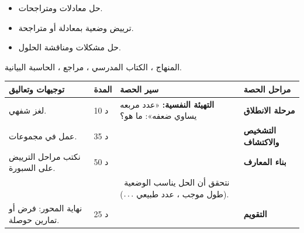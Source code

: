 \documentclass[12pt,a4paper]{article}
\newenvironment{LTR}{\begin{otherlanguage}{english}}{\end{otherlanguage}}
\newcommand{\ar}[1]{\foreignlanguage{arabic}{#1}}
\renewcommand{\ldots}{\mathinner{\ldotp\ldotp\ldotp}}
\newcommand{\Phase}[1]{\textbf{#1}}
\newenvironment{Sayr}{%
\begin{LTR}\renewcommand{\arraystretch}{1.25}
\begin{longtable}{|p{0.17\textwidth}|>{\centering\arraybackslash}p{0.06\textwidth}|p{0.53\textwidth}|>{\centering\arraybackslash}p{0.12\textwidth}|}
\hline\rowcolor{cThm!12}\ar{\textbf{توجيهات وتعاليق}} & \ar{\textbf{المدة}} & \ar{\textbf{سير الحصة}} & \ar{\textbf{مراحل الحصة}}\\\hline\endhead
\hline\endfoot}{\end{longtable}\end{LTR}}
\newcommand{\Row}[4]{\ar{\small #4} & \ar{#3} & \ar{#2} & \cellcolor{cThm!8}\ar{\Phase{#1}}\\\hline}
\newcommand{\Lab}[2]{\foreignlanguage{english}{\tcbox[on line,colback=#1,colframe=#1,boxrule=0pt,arc=2pt,boxsep=1pt,left=5pt,right=5pt,top=1pt,bottom=1pt]{\ar{\textcolor{white}{\textbf{#2}}}}}}
\newcommand{\Num}[1]{\foreignlanguage{english}{\tikz[baseline=(c.base)]\node[fill=cDef,text=white,inner sep=2pt,font=\footnotesize\bfseries](c){#1};}}
\newcommand{\ck}{\ensuremath{{\color{cRem}\checkmark}}}
\begin{document}
{\begin{itemize}\item حل معادلات ومتراجحات.\end{itemize}}%
{\begin{itemize}\item ترييض وضعية بمعادلة أو متراجحة.\item حل مشكلات ومناقشة الحلول.\end{itemize}}%
{المنهاج ، الكتاب المدرسي ، مراجع ، الحاسبة البيانية.}
\begin{Sayr}
\Row{مرحلة الانطلاق}{%
\textbf{التهيئة النفسية:} «عدد مربعه يساوي ضعفه»: ما هو؟}{10 د}{لغز شفهي.}
\Row{التشخيص والاكتشاف}{%
\Lab{cEx}{وضعية مقترحة}\par مستطيل محيطه $34$ m ومساحته $60$ m². ما بعداه؟\par\ck\ نسمي $x$ أحد البعدين ، فالآخر $17-x$.\par
\ck\ $x(17-x)=60\iff x^2-17x+60=0$ ؛ $\Delta=49$ ، $x=12$ أو $x=5$.\par
\ck\ البعدان $12$ m و $5$ m.\par
}{35 د}{عمل في مجموعات.}
\Row{بناء المعارف}{%
\Lab{cMeth}{مراحل الترييض}\par\ck\ اختيار المجهول وتحديد مجموعة قيمه الممكنة.\par
\ck\ ترجمة المعطيات إلى معادلة أو متراجحة.\par
\ck\ الحل ، ثم مناقشة الحلول المقبولة حسب الوضعية.\par
\Lab{cEx}{مثال}\par\ck\ عددان طبيعيان متتابعان جداؤهما $156$: $n(n+1)=156$ ، $n=12$ (نرفض $-13$): العددان $12$ و $13$.\par
\ck\ حديقة مربعة يحيط بها ممر عرضه $1$ m ، المساحة الكلية $64$ m²: $(x+2)^2=64$ ، $x=6$ m.\par
}{50 د}{نكتب مراحل الترييض على السبورة.}
\Row{}{%
\Lab{cThm!80!black}{حذار}\ نتحقق أن الحل يناسب الوضعية (طول موجب ، عدد طبيعي $\ldots$).}{}{}
\Row{التقويم}{%
\Lab{cEx}{تطبيق}\par\Num{1} عيّن عددين مجموعهما $10$ وجداؤهما $21$. \Num{2} ما قيم $x$ التي تجعل مساحة مربع ضلعه $x$ أكبر من محيطه؟\par\textbf{الحل:} \Num{1} $t^2-10t+21=0$: $3$ و $7$ ؛ \Num{2} $x^2>4x$ و $x>0$: $x>4$.\par\textbf{واجب منزلي:} تمارين حوصلة المحور من الكتاب المدرسي.\par\smallskip\textbf{ملاحظات حول سير الحصة:} \dotfill}{25 د}{نهاية المحور: فرض أو تمارين حوصلة.}
\end{Sayr}
\end{document}
